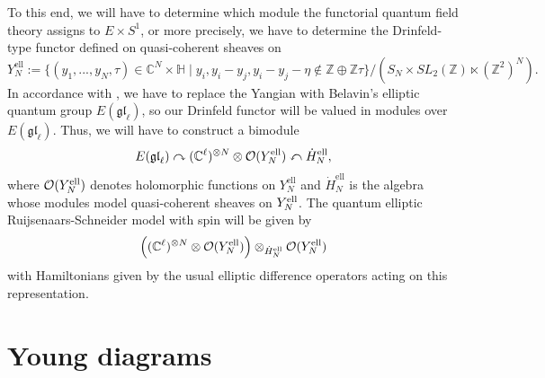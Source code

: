 \documentclass[11pt]{report}
\theoremstyle{definition}
\theoremstyle{remark}
\theoremstyle{remark}
\newcommand{\Z}{\mathbb{Z}}
\newcommand{\C}{\mathbb{C}}
\begin{document}
To this end, we will have to determine which module the functorial quantum field theory assigns to $E \times S^1$, or more precisely, we have to determine the Drinfeld-type functor defined on quasi-coherent sheaves on
\begin{equation*}
Y_N^\text{ell} := \{ (y_1,...,y_N,\tau) \in \C^N \times \mathbb{H} \mid y_i,y_i-y_j,y_i-y_j-\eta \notin \Z \oplus \Z \tau \}/(S_N \times SL_2(\Z) \ltimes (\Z^2)^N).
\end{equation*}
In accordance with \cite{article:costello:2018b}, we have to replace the Yangian with Belavin's elliptic quantum group $E(\mathfrak{gl}_\ell)$, so our Drinfeld functor will be valued in modules over $E(\mathfrak{gl}_\ell)$. Thus, we will have to construct a bimodule
\begin{equation*}
E(\mathfrak{gl}_\ell) \curvearrowright (\C^\ell)^{\otimes N} \otimes \mathcal{O}(Y_N^\textnormal{ell}) \curvearrowleft \dot H_N^\text{ell},
\end{equation*}
where $\mathcal{O}(Y_N^\textnormal{ell})$ denotes holomorphic functions on $Y_N^\text{ell}$ and $\dot H_N^\text{ell}$ is the algebra whose modules model quasi-coherent sheaves on $Y_N^\textnormal{ell}$. The quantum elliptic Ruijsenaars-Schneider model with spin will be given by
\begin{equation*}
\Big( (\C^\ell)^{\otimes N} \otimes \mathcal{O}(Y_N^\textnormal{ell}) \Big) \otimes_{\dot H_N^\text{ell}} \mathcal{O}(Y_N^\textnormal{ell})
\end{equation*}
with Hamiltonians given by the usual elliptic difference operators acting on this representation.



\appendix \label{appendix}

\chapter{Young diagrams} \label{appendix:youngdiagrams}
\end{document}
